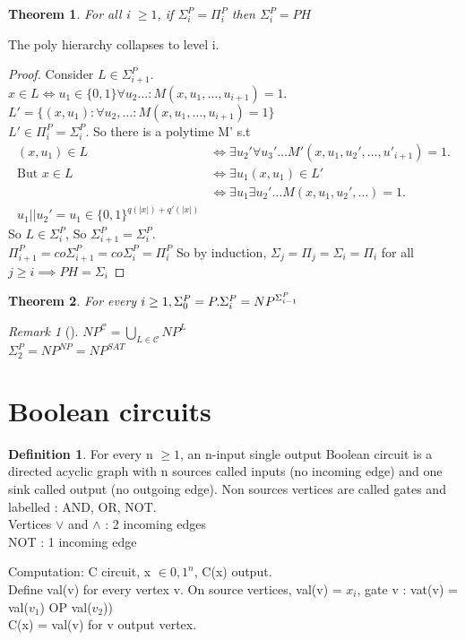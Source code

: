 \documentclass{article}
\newtheorem{theorem}{Theorem}
\theoremstyle{definition}
\newtheorem{definition}{Definition}
\theoremstyle{remark}
\newtheorem*{remark}{Remark}
\newcommand{\Rem}[3]{\begin{remark}[#1]\label{#2}#3\end{remark}}
\begin{document}
\begin{theorem}
	For all i $\geq 1$, if $\Sigma_{i}^{P} = \Pi_{i}^{P}$ then $\Sigma_{i}^{P} = PH$
\end{theorem}
The poly hierarchy collapses to level i.
\begin{proof}
	Consider $L \in \Sigma_{i+1}^{P}$.\\
	$x \in L \Leftrightarrow u_1 \in \{0,1\} \forall u_2 \dots : M(x,u_1,\dots,u_{i+1}) = 1$.\\
	$L' = \{(x,u_1): \forall u_2, \dots:M(x,u_1,\dots,u_{i+1}) = 1\}$\\
	$L' \in \Pi_i^P = \Sigma_i^P$. So there is a polytime M' s.t
	\begin{align*}
		(x,u_1)\in L & \Leftrightarrow  \exists u_2'\forall u_3'\dots M'(x,u_1,u_2',\dots,u'_{i+1}) = 1.\\
		\text{But } x\in L & \Leftrightarrow  \exists u_1 (x,u_1) \in L'\\
		& \Leftrightarrow \exists u_1 \exists u_2' \dots M(x,u_1,u_2',\dots) = 1.\\
		u_1||u_2' = u_1 \in \{0,1\}^{q(|x|)+q'(|x|)}
	\end{align*}
	So $L \in \Sigma_i^P$, So $\Sigma_{i+1}^P = \Sigma_i^P$.\\
	$\Pi_{i+1}^P = co\Sigma_{i+1}^P = co\Sigma_i^P = \Pi_i^P$
	So by induction, $\Sigma_j = \Pi_j = \Sigma_i = \Pi_i$ for all $j \geq i \implies PH = \Sigma_i$
\end{proof}

\begin{theorem}
	For every $i \geq 1, \Sigma_0^P = P.\\
	\Sigma_i^P = NP^{\Sigma_{i-1}^P}$
\end{theorem}

\Rem{}{}{$NP^{\mathcal{C}} = \bigcup\limits_{L\in\mathcal{C}} NP^L$\\
	$\Sigma_2^P = NP^{NP}= NP^{SAT}$}

\section{Boolean circuits}
\begin{definition}
	For every n $\geq 1$, an n-input single output Boolean circuit is a directed acyclic graph with n sources called inputs (no incoming edge) and one sink called output (no outgoing edge). Non sources vertices are called gates and labelled : AND, OR, NOT.\\
	Vertices $\vee$ and $\wedge$ : 2 incoming edges\\
	\indent NOT : 1 incoming edge\\
\end{definition}
Computation: C circuit, x $\in {0,1}^n$, C(x) output.\\
Define val(v) for every vertex v. On source vertices, val(v) = $x_i$, gate v : vat(v) = val($v_1$) OP val($v_2$))\\
C(x) = val(v) for v output vertex.
\end{document}
